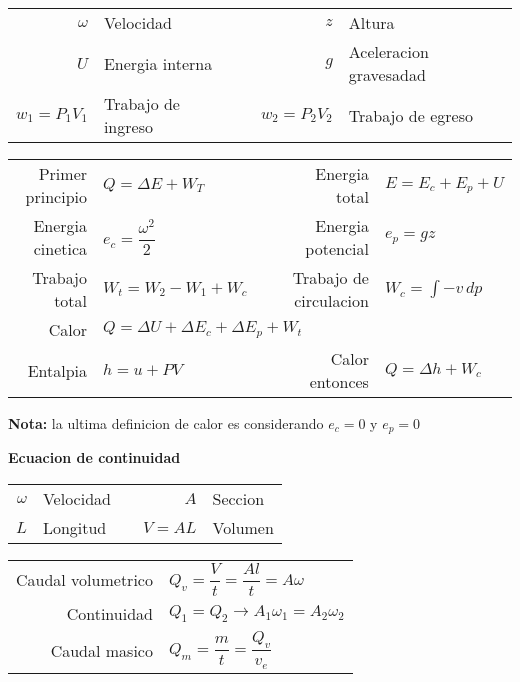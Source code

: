 \documentclass[a4paper, 11pt,titlepage]{book}
\begin{document}
\begin{tcolorbox}[title = \large\textbf{Sistemas abiertos}]
        \begin{tabular}{r l c r l}
         	$\omega$ & Velocidad && $z$ & Altura \\
         	$U$ & Energia interna && $g$ & Aceleracion gravesadad \\
         	$w_1 = P_1 V_1$ & Trabajo de ingreso && $w_2 = P_2 V_2$& Trabajo de egreso \\
         	
        \end{tabular}
	\begin{center}
			\begin{tabular}{r | l c r | l}
					\vspace{.3cm} Primer principio & $Q = \Delta E + W_T$ && Energia total & $E = E_c + E_p + U$\\
					\vspace{.3cm} Energia cinetica & $e_c = \dfrac{\omega^2}{2}$ && Energia potencial & $e_p = gz$\\
					\vspace{.3cm} Trabajo total & $W_t = W_2 - W_1 + W_c$ && Trabajo de circulacion & $W_c = \int -v \, dp$\\
					\vspace{.3cm} Calor & \multicolumn{4}{l}{$Q = \Delta U + \Delta E_c + \Delta E_p + W_t $ }\\
					\vspace{.3cm} Entalpia & $h = u + PV$ && Calor entonces & $Q = \Delta h + W_c$
				\end{tabular}
		\end{center}
	\small{\textbf{Nota:} la ultima definicion de calor es considerando $e_c=0$ y $e_p=0$}\\
	\normalsize
	
	\textbf{Ecuacion de continuidad}\\
	
	\begin{tabular}{r l c r l}
		$\omega$ & Velocidad && $A$ & Seccion\\
		$L$ & Longitud && $V = AL$ & Volumen \\
	\end{tabular}
    \begin{center}
    	\begin{tabular}{r | l c r | l}
    		\vspace{.3cm} Caudal volumetrico & \multicolumn{4}{l}{$Q_v = \dfrac{V}{t} = \dfrac{Al}{t}= A \omega$} \\
    		\vspace{.3cm} Continuidad & \multicolumn{4}{l}{$Q_1 = Q_2\rightarrow A_1 \omega_1 =A_2 \omega_2$}\\
    		\vspace{.3cm} Caudal masico & $Q_m = \dfrac{m}{t} = \dfrac{Q_v}{v_e}$    		
    	\end{tabular}
    \end{center}
\end{tcolorbox}
\end{document}
